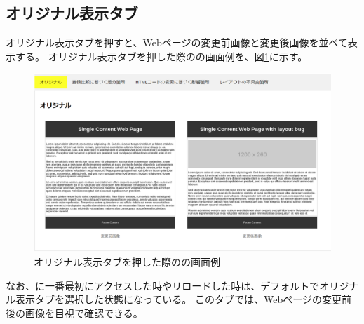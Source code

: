 \subsection{オリジナル表示タブ}\label{subsec:original_tab}
オリジナル表示タブを押すと、Webページの変更前画像と変更後画像を並べて表示する。
オリジナル表示タブを押した際の\toolName の画面例を、図\ref{fig: Appearance_original_tab}に示す。
\begin{figure}[tp]
    \begin{center}
        \includegraphics[width=1.0\columnwidth]{image/3_original_tab2.png}
        \caption{オリジナル表示タブを押した際の\toolName の画面例}
        \label{fig: Appearance_original_tab}
    \end{center}
\end{figure}
なお、\toolName に一番最初にアクセスした時やリロードした時は、デフォルトでオリジナル表示タブを選択した状態になっている。
このタブでは、Webページの変更前後の画像を目視で確認できる。

